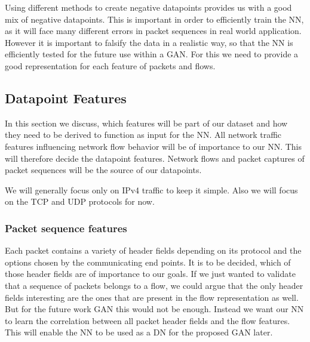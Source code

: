 \documentclass[
	ngerman,
	ruledheaders=section,%
	class=report,%
	thesis={type=bachelor},%
	accentcolor=9c,%
	custommargins=true,%
	marginpar=false,%
	parskip=half-,%
	fontsize=11pt,%
]{tudapub}
\begin{document}
Using different methods to create negative datapoints provides us with a good mix of negative datapoints.
This is important in order to efficiently train the NN, as it will face many different errors in packet sequences in real world application.
However it is important to falsify the data in a realistic way, so that the NN is efficiently tested for the future use within a GAN.
For this we need to provide a good representation for each feature of packets and flows.

\subsection{Datapoint Features}
\label{sec:datapointFeatures}

In this section we discuss, which features will be part of our dataset and how they need to be derived to function as input for the NN.
All network traffic features influencing network flow behavior will be of importance to our NN.
This will therefore decide the datapoint features.
Network flows and packet captures of packet sequences will be the source of our datapoints.

We will generally focus only on IPv4 traffic to keep it simple.
Also we will focus on the TCP and UDP protocols for now.


\subsubsection{Packet sequence features}
\label{sec:packtFeatures}


Each packet contains a variety of header fields depending on its protocol and the options chosen by the communicating end points.
It is to be decided, which of those header fields are of importance to our goals.
If we just wanted to validate that a sequence of packets belongs to a flow, we could argue that the only header fields interesting are the ones that are present in the flow representation as well.
But for the future work GAN this would not be enough.
Instead we want our NN to learn the correlation between all packet header fields and the flow features.
This will enable the NN to be used as a DN for the proposed GAN later.
\end{document}
